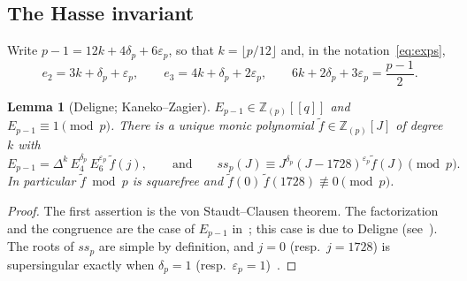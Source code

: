 \documentclass[11pt,a4paper]{article}
\newtheorem{lemma}[theorem]{Lemma}
\theoremstyle{definition}
\theoremstyle{remark}
\newcommand{\Z}{\mathbb{Z}}
\newcommand{\ssp}{\mathit{ss}_p}
\newcommand{\Zp}{\Z_{(p)}}
\numberwithin{equation}{section}
\begin{document}
\subsection{The Hasse invariant}

Write $p-1=12k+4\delta_p+6\varepsilon_p$, so that $k=\lfloor p/12\rfloor$ and,
in the notation~\eqref{eq:exps},
\begin{equation}\label{eq:e2e3k}
e_2=3k+\delta_p+\varepsilon_p,\qquad e_3=4k+\delta_p+2\varepsilon_p,\qquad
6k+2\delta_p+3\varepsilon_p=\frac{p-1}{2}.
\end{equation}

\begin{lemma}[Deligne; Kaneko--Zagier]\label{lem:KZ}
$E_{p-1}\in\Zp[[q]]$ and $E_{p-1}\equiv1\pmod p$. There is a unique monic
polynomial $\tilde f\in\Zp[J]$ of degree $k$ with
\[
E_{p-1}=\Delta^k\,E_4^{\delta_p}\,E_6^{\varepsilon_p}\,\tilde f(j),
\qquad\text{and}\qquad
\ssp(J)\equiv J^{\delta_p}(J-1728)^{\varepsilon_p}\tilde f(J)\pmod p.
\]
In particular $\tilde f\bmod p$ is squarefree and
$\tilde f(0)\,\tilde f(1728)\not\equiv0\pmod p$.
\end{lemma}
\begin{proof}
The first assertion is the von Staudt--Clausen theorem. The factorization
and the congruence are the case of $E_{p-1}$ in~\cite[Theorem~1]{KZ}; this
case is due to Deligne (see~\cite{Serre}). The roots of $\ssp$ are simple by definition, and $j=0$
(resp.\ $j=1728$) is supersingular exactly when $\delta_p=1$ (resp.\
$\varepsilon_p=1$)~\cite[V.4]{Silverman}.
\end{proof}
\end{document}
